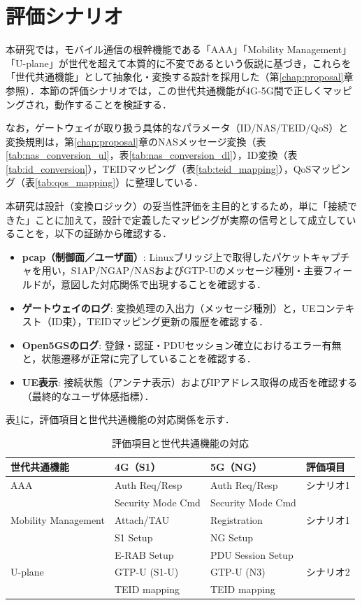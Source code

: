 \section{評価シナリオ}

本研究では，モバイル通信の根幹機能である「AAA」「Mobility Management」「U-plane」が世代を超えて本質的に不変であるという仮説に基づき，これらを「世代共通機能」として抽象化・変換する設計を採用した（第\ref{chap:proposal}章参照）．本節の評価シナリオでは，この世代共通機能が4G-5G間で正しくマッピングされ，動作することを検証する．

なお，ゲートウェイが取り扱う具体的なパラメータ（ID/NAS/TEID/QoS）と変換規則は，第\ref{chap:proposal}章のNASメッセージ変換（表\ref{tab:nas_conversion_ul}，表\ref{tab:nas_conversion_dl}），ID変換（表\ref{tab:id_conversion}），TEIDマッピング（表\ref{tab:teid_mapping}），QoSマッピング（表\ref{tab:qos_mapping}）に整理している．

本研究は設計（変換ロジック）の妥当性評価を主目的とするため，単に「接続できた」ことに加えて，設計で定義したマッピングが実際の信号として成立していることを，以下の証跡から確認する．
\begin{itemize}
    \item \textbf{pcap（制御面／ユーザ面）}: Linuxブリッジ上で取得したパケットキャプチャを用い，S1AP/NGAP/NASおよびGTP-Uのメッセージ種別・主要フィールドが，意図した対応関係で出現することを確認する．
    \item \textbf{ゲートウェイのログ}: 変換処理の入出力（メッセージ種別）と，UEコンテキスト（ID束），TEIDマッピング更新の履歴を確認する．
    \item \textbf{Open5GSのログ}: 登録・認証・PDUセッション確立におけるエラー有無と，状態遷移が正常に完了していることを確認する．
    \item \textbf{UE表示}: 接続状態（アンテナ表示）およびIPアドレス取得の成否を確認する（最終的なユーザ体感指標）．
\end{itemize}

表\ref{tab:generation_invariant_mapping}に，評価項目と世代共通機能の対応関係を示す．

\begin{table}[htbp]
\centering
\caption{評価項目と世代共通機能の対応}
\label{tab:generation_invariant_mapping}
\begin{tabular}{|l|l|l|l|}
\hline
\textbf{世代共通機能} & \textbf{4G（S1）} & \textbf{5G（NG）} & \textbf{評価項目} \\
\hline
AAA & Auth Req/Resp & Auth Req/Resp & シナリオ1 \\
& Security Mode Cmd & Security Mode Cmd & \\
\hline
Mobility Management & Attach/TAU & Registration & シナリオ1 \\
& S1 Setup & NG Setup & \\
& E-RAB Setup & PDU Session Setup & \\
\hline
U-plane & GTP-U (S1-U) & GTP-U (N3) & シナリオ2 \\
& TEID mapping & TEID mapping & \\
\hline
\end{tabular}
\end{table}

